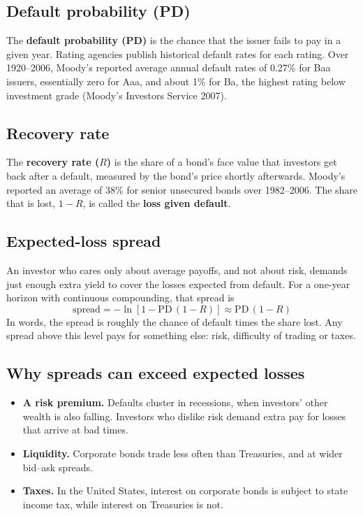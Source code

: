 \subsection{Default probability (PD)}

The \textbf{default probability (PD)} is the chance that the issuer fails to pay in a given year. Rating agencies publish historical default rates for each rating. Over 1920--2006, Moody's reported average annual default rates of 0.27\% for Baa issuers, essentially zero for Aaa, and about 1\% for Ba, the highest rating below investment grade (Moody's Investors Service 2007).

\subsection{Recovery rate}

The \textbf{recovery rate ($R$)} is the share of a bond's face value that investors get back after a default, measured by the bond's price shortly afterwards. Moody's reported an average of 38\% for senior unsecured bonds over 1982--2006. The share that is lost, $1 - R$, is called the \textbf{loss given default}.

\subsection{Expected-loss spread}

An investor who cares only about average payoffs, and not about risk, demands just enough extra yield to cover the losses expected from default. For a one-year horizon with continuous compounding, that spread is
\begin{equation}
  \text{spread} = -\ln\!\left[1 - \mathrm{PD}\,(1 - R)\right] \approx \mathrm{PD}\,(1 - R)
  \label{eq:15-el}
\end{equation}
In words, the spread is roughly the chance of default times the share lost. Any spread above this level pays for something else: risk, difficulty of trading or taxes.

\subsection{Why spreads can exceed expected losses}

\begin{itemize}
  \item \textbf{A risk premium.} Defaults cluster in recessions, when investors' other wealth is also falling. Investors who dislike risk demand extra pay for losses that arrive at bad times.
  \item \textbf{Liquidity.} Corporate bonds trade less often than Treasuries, and at wider bid--ask spreads.
  \item \textbf{Taxes.} In the United States, interest on corporate bonds is subject to state income tax, while interest on Treasuries is not.
\end{itemize}

